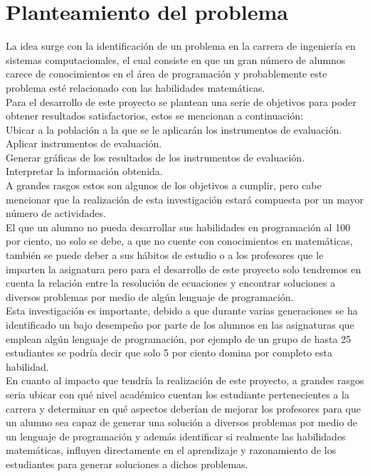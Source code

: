 \documentclass[12pt] {report}
\begin{document}
\section{Planteamiento del problema}
La idea surge con la identificación de un problema en la carrera de ingeniería en sistemas computacionales, el cual consiste en que un gran número de alumnos carece de conocimientos en el área de programación y probablemente este problema esté relacionado con las habilidades matemáticas.\\
Para el desarrollo de este proyecto se plantean una serie de objetivos para poder obtener resultados satisfactorios, estos se mencionan a continuación:\\
Ubicar a la población a la que se le aplicarán los instrumentos de evaluación.\\
Aplicar instrumentos de evaluación.\\
Generar gráficas de los resultados de los instrumentos de evaluación.\\
Interpretar la información obtenida.\\
A grandes rasgos estos son algunos de los objetivos a cumplir, pero cabe mencionar que la realización de esta investigación estará compuesta por un mayor número de actividades.\\
El que un alumno no pueda desarrollar sus habilidades en programación al 100 por ciento, no solo se debe, a que no cuente con conocimientos en matemáticas, también se puede deber a sus hábitos de estudio o a los profesores que le imparten la asignatura pero para el desarrollo de este proyecto solo tendremos en cuenta la relación entre la resolución de ecuaciones y encontrar soluciones a diversos problemas por medio de algún lenguaje de programación.\\
Esta investigación es importante, debido a que durante varias generaciones se ha identificado un bajo desempeño por parte de los alumnos en las asignaturas que emplean algún lenguaje de programación, por ejemplo de un grupo de hasta 25 estudiantes se podría decir que solo 5 por ciento domina por completo esta habilidad.\\
En cuanto al impacto que tendría la realización de este proyecto, a grandes rasgos seria ubicar con qué nivel académico cuentan los estudiante pertenecientes a la carrera y determinar en qué aspectos deberían de mejorar los profesores para que un alumno sea capaz de generar una solución a diversos problemas por medio de un lenguaje de programación y además identificar si realmente las habilidades matemáticas, influyen directamente en el aprendizaje y razonamiento de los estudiantes para generar soluciones a dichos problemas.\\
\end{document}
